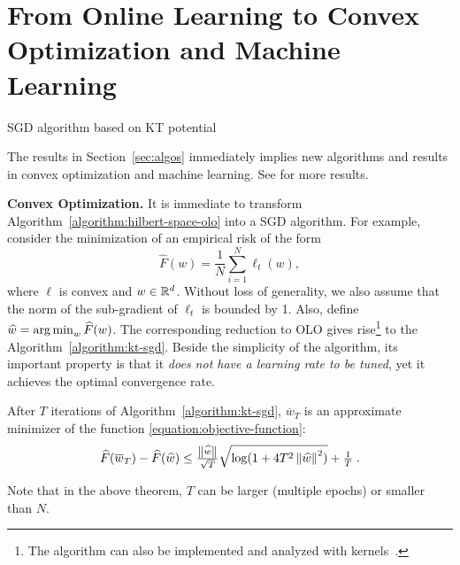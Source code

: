 \section{From Online Learning to Convex Optimization and Machine Learning}
\label{section:applications}

\begin{algorithm}[t]
\caption{SGD algorithm based on KT potential \label{algorithm:kt-sgd}}
\begin{algorithmic}[1]
{
\ENDFOR
{}
}
\end{algorithmic}
\end{algorithm}

The results in Section~\ref{sec:algos} immediately implies new algorithms and
results in convex optimization and machine learning. See \cite{Orabona-2014} for more results.

\textbf{Convex Optimization.} It is immediate to transform
Algorithm~\ref{algorithm:hilbert-space-olo} into a \ac{SGD} algorithm.  For
example, consider the minimization of an empirical risk of the
form
%
\begin{equation}
\label{equation:objective-function}
\widehat{F}(w) = \frac{1}{N} \sum_{i=1}^N \ell_t(w),
\end{equation}
%
where $\ell$ is convex and $w \in \mathbb{R}^d$. Without loss of generality, we also
assume that the norm of the sub-gradient of $\ell_t$ is bounded by 1. Also,
define $\widehat{w}=  \operatorname*{arg\,min}_w \widehat{F}(w)$.  The corresponding reduction to OLO
gives rise\footnote{The algorithm can also be implemented and analyzed with kernels~\citep{Orabona-2014}.}
to the Algorithm~\ref{algorithm:kt-sgd}.
Beside the simplicity of the algorithm, its important property is that it
\emph{does not have a learning rate to be tuned}, yet it achieves the optimal
convergence rate.
%
\begin{theorem}
After $T$ iterations of Algorithm~\ref{algorithm:kt-sgd}, $\overline{w}_T$ is
an approximate minimizer of the function \eqref{equation:objective-function}:
\[
\widehat{F}(\overline{w}_T) - \widehat{F}(\widehat{w}) \leq \tfrac{\left\|{\widehat{w}}\right\|}{\sqrt{T}} \sqrt{\log(1+4 T^2 \left\|{\widehat{w}}\right\|^2)} +\tfrac{1}{T} \; .
\]
\end{theorem}
%
Note that in the above theorem, $T$ can be larger (multiple epochs) or smaller
than $N$.

